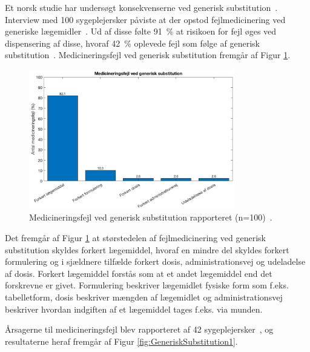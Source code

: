 Et norsk studie har undersøgt konsekvenserne ved generisk substitution~\citep{Hakonsen2010}. Interview med 100 sygeplejersker påviste at der opstod fejlmedicinering ved generiske lægemidler~\citep{Hakonsen2010}. Ud af disse følte %
91~\% at risikoen for fejl øges ved dispensering af disse, hvoraf 42~\% oplevede fejl som følge af generisk substitution~\citep{Hakonsen2010}.
Medicineringsfejl ved generisk substitution fremgår af Figur \ref{fig:GeneriskSubstitution}.

\begin{figure}[H]\centering	\includegraphics[width=0.8\textwidth]{billeder/GenSub.png} 
	\caption{Medicineringsfejl ved generisk substitution rapporteret (n=100)~\citep{Hakonsen2010}.}
	\label{fig:GeneriskSubstitution}  
\end{figure}

Det fremgår af Figur \ref{fig:GeneriskSubstitution} at størstedelen af fejlmedicinering ved generisk substitution skyldes forkert lægemiddel, hvoraf en mindre del skyldes forkert formulering og i sjældnere tilfælde forkert dosis, administrationsvej og udeladelse af dosis. Forkert lægemiddel forstås som at et andet lægemiddel end det forskrevne er givet. Formulering beskriver lægemidlet fysiske form som f.eks. tabelletform, dosis beskriver mængden af lægemidlet og administrationsvej beskriver hvordan indgiften af et lægemiddel tages f.eks. via munden.

Årsagerne til medicineringsfejl blev rapporteret af 42 sygeplejersker~\citep{Hakonsen2010}, og resultaterne heraf fremgår af Figur \ref{fig:GeneriskSubstitution1}.

